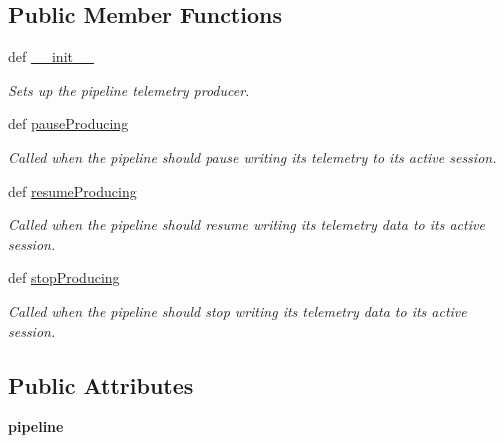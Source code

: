 \subsection*{Public Member Functions}
\begin{DoxyCompactItemize}
\item 
def \hyperlink{classhwm_1_1hardware_1_1pipelines_1_1pipeline_1_1_pipeline_telemetry_producer_aa4dca51111e760b275384ea42567a2f4}{\-\_\-\-\_\-init\-\_\-\-\_\-}
\begin{DoxyCompactList}\small\item\em Sets up the pipeline telemetry producer. \end{DoxyCompactList}\item 
def \hyperlink{classhwm_1_1hardware_1_1pipelines_1_1pipeline_1_1_pipeline_telemetry_producer_ab37a20b19c9f72df38f72829addbd7d6}{pause\-Producing}
\begin{DoxyCompactList}\small\item\em Called when the pipeline should pause writing its telemetry to its active session. \end{DoxyCompactList}\item 
def \hyperlink{classhwm_1_1hardware_1_1pipelines_1_1pipeline_1_1_pipeline_telemetry_producer_a52890f0a52b2a3eb9f11bcd0625a0adf}{resume\-Producing}
\begin{DoxyCompactList}\small\item\em Called when the pipeline should resume writing its telemetry data to its active session. \end{DoxyCompactList}\item 
def \hyperlink{classhwm_1_1hardware_1_1pipelines_1_1pipeline_1_1_pipeline_telemetry_producer_a5d9223022a74100f45db391bf2b88521}{stop\-Producing}
\begin{DoxyCompactList}\small\item\em Called when the pipeline should stop writing its telemetry data to its active session. \end{DoxyCompactList}\end{DoxyCompactItemize}
\subsection*{Public Attributes}
\begin{DoxyCompactItemize}
\item 
\hypertarget{classhwm_1_1hardware_1_1pipelines_1_1pipeline_1_1_pipeline_telemetry_producer_a42e29e352a4159330a0bcf50b83613ea}{{\bfseries pipeline}}\label{classhwm_1_1hardware_1_1pipelines_1_1pipeline_1_1_pipeline_telemetry_producer_a42e29e352a4159330a0bcf50b83613ea}

\end{DoxyCompactItemize}


